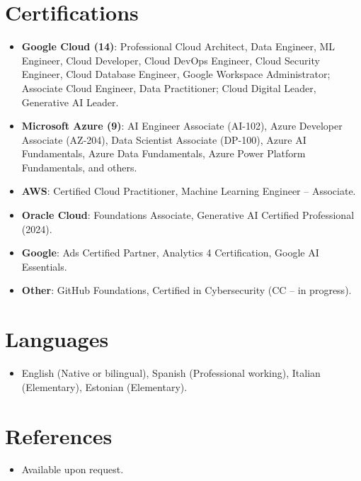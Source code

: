 \documentclass[11pt,a4paper,sans]{moderncv}
\begin{document}

\section{Certifications}
\vspace{1pt}
\begin{itemize}
\item \textbf{Google Cloud (14)}: Professional Cloud Architect, Data Engineer, ML Engineer, Cloud Developer, Cloud DevOps Engineer, Cloud Security Engineer, Cloud Database Engineer, Google Workspace Administrator; Associate Cloud Engineer, Data Practitioner; Cloud Digital Leader, Generative AI Leader.
\item \textbf{Microsoft Azure (9)}: AI Engineer Associate (AI-102), Azure Developer Associate (AZ-204), Data Scientist Associate (DP-100), Azure AI Fundamentals, Azure Data Fundamentals, Azure Power Platform Fundamentals, and others.
\item \textbf{AWS}: Certified Cloud Practitioner, Machine Learning Engineer -- Associate.
\item \textbf{Oracle Cloud}: Foundations Associate, Generative AI Certified Professional (2024).
\item \textbf{Google}: Ads Certified Partner, Analytics 4 Certification, Google AI Essentials.
\item \textbf{Other}: GitHub Foundations, Certified in Cybersecurity (CC -- in progress).
\end{itemize}


\section{Languages}
\vspace{1pt}
\begin{itemize}
\item English (Native or bilingual), Spanish (Professional working), Italian (Elementary), Estonian (Elementary).
\end{itemize}


\section{References}
\vspace{1pt}
\begin{itemize}
\item{Available upon request.}
\end{itemize}
\end{document}
